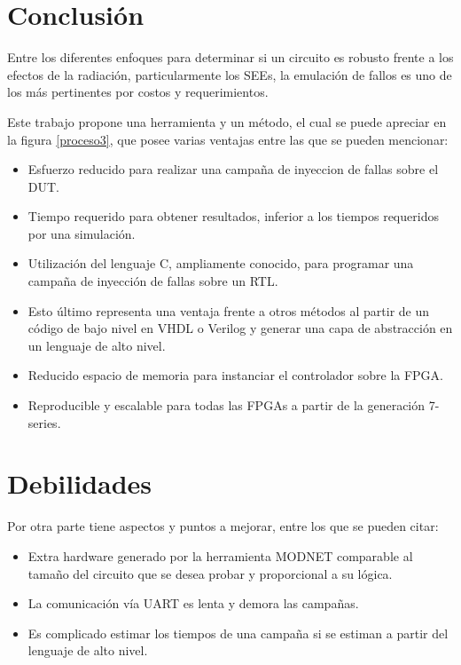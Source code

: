 \documentclass[a4paper,openright,12pt]{report}
\begin{document}
\section{Conclusión }
Entre  los diferentes  enfoques para determinar si un circuito es robusto frente a los efectos de la radiación, particularmente los SEEs, la emulación de fallos es uno de los más pertinentes por costos y requerimientos.


Este trabajo propone una herramienta y un  método, el cual se puede apreciar en la figura \ref{proceso3}, que posee varias ventajas entre las que  se pueden mencionar: 
\begin{itemize}
\item Esfuerzo reducido para realizar una campaña de inyeccion de fallas sobre el DUT.
\item Tiempo requerido para obtener resultados, inferior a los tiempos requeridos por una simulación.
\item  Utilización del lenguaje C, ampliamente conocido, para programar  una campaña de inyección de fallas sobre un RTL.

\item Esto último representa una ventaja frente a otros métodos al partir de un código de bajo nivel en VHDL o Verilog y generar una capa de abstracción en un lenguaje de alto nivel. 

\item Reducido espacio de memoria para instanciar el controlador sobre la FPGA.

\item Reproducible y escalable para todas las FPGAs a partir de la generación 7-series.
\end{itemize}




  \section{Debilidades }
Por otra parte tiene aspectos y puntos a mejorar, entre los que  se pueden citar:

\begin{itemize}
\item Extra hardware generado  por la herramienta MODNET comparable al tamaño del circuito que se desea probar y proporcional a su lógica.
\item La comunicación vía UART es lenta y demora las campañas.
\item Es complicado estimar los tiempos de una campaña si se estiman a partir del lenguaje de alto nivel.

\end{itemize}
\end{document}
